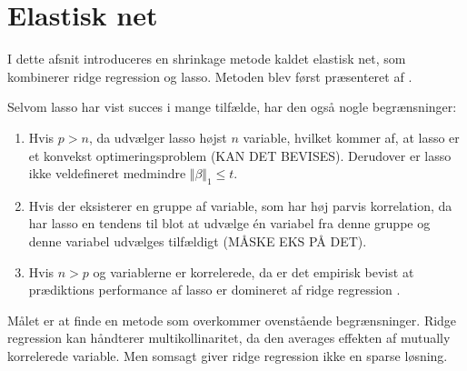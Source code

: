 \section{Elastisk net}
I dette afsnit introduceres en shrinkage metode kaldet elastisk net, som kombinerer ridge regression og lasso.
Metoden blev først præsenteret af \citep{zou_hastie}.

Selvom lasso har vist succes i mange tilfælde, har den også nogle begrænsninger:
%
\begin{enumerate}[label=\textnormal{(\arabic*)}]
    \item Hvis $p>n$, da udvælger lasso højst $n$ variable, hvilket kommer af, at lasso er et konvekst optimeringsproblem (KAN DET BEVISES). Derudover er lasso ikke veldefineret medmindre \(\Vert \beta \Vert_1 \leq t\). \label{itm:1}
    \item Hvis der eksisterer en gruppe af variable, som har høj parvis korrelation, da har lasso en tendens til blot at udvælge  én variabel fra denne gruppe og denne variabel udvælges tilfældigt (MÅSKE EKS PÅ DET). \label{itm:2}
    \item Hvis $n>p$ og variablerne er korrelerede, da er det empirisk bevist at prædiktions performance af lasso er domineret af ridge regression \citep{lasso}.  \label{itm:3}
\end{enumerate}
%
Målet er at finde en metode som overkommer ovenstående begrænsninger.
Ridge regression kan håndterer multikollinaritet, da den averages effekten af mutually korrelerede variable.
Men somsagt giver ridge regression ikke en sparse løsning.

